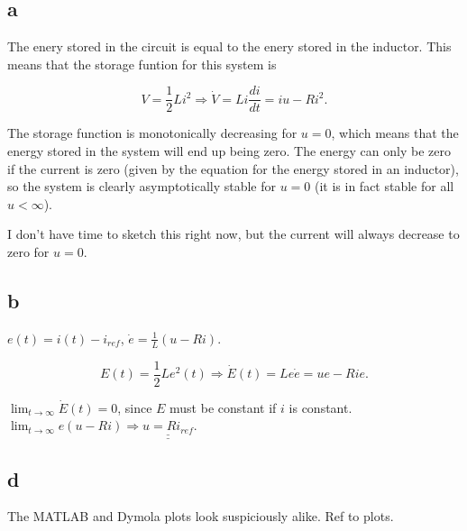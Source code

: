 \documentclass{article}
\begin{document}
\subsection{a}

The enery stored in the circuit is equal to the enery stored in the inductor. This means that the storage funtion for this system is 

\begin{equation*}
    V = \frac{1}{2} L i^2 \Rightarrow \dot V = Li\frac{di}{dt} = iu - Ri^2.
\end{equation*}

The storage function is monotonically decreasing for $u = 0$, which means that the energy stored in the system will end up being zero. The energy can only be zero if the current is zero (given by the equation for the energy stored in an inductor), so the system is clearly asymptotically stable for $u = 0$ (it is in fact stable for all $u < \infty$). 

I don't have time to sketch this right now, but the current will always decrease to zero for $u = 0$.

\subsection{b}

$e(t) = i(t) - i_{ref}$, $\dot e = \frac{1}{L}(u - Ri)$. 

\begin{equation*}
    E(t) = \frac{1}{2}Le^2(t) \Rightarrow \dot E(t) = Le\dot e = ue - Rie.
\end{equation*} 

$\lim_{t\to \infty} \dot E (t) = 0$, since $E$ must be constant if $i$ is constant. $\lim_{t\to \infty} e(u - Ri) \Rightarrow \underline{\underline{u = Ri_{ref}}}$.

\subsection{d}

The MATLAB and Dymola plots look suspiciously alike. Ref to plots.
\end{document}
